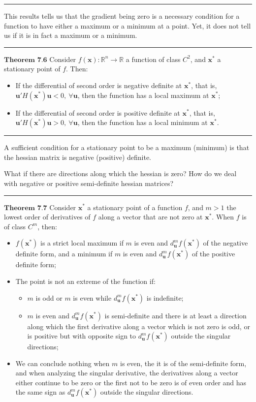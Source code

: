 \documentclass[0pt, a4paper]{article}
\begin{document}
\noindent\rule{\textwidth}{1pt}

This results tells us that the gradient being zero is a necessary condition for a function to have either a maximum or a minimum at a point. Yet, it does not tell us if it is in fact a maximum or a minimum.

\noindent\rule{\textwidth}{1pt}

$\textbf{Theorem 7.6}$ Consider $f(\textbf{x}):\mathbb{R}^n\to\mathbb{R}$ a function of class $C^2$, and $\textbf{x}^*$ a stationary point of $f$. Then:
\begin{itemize}
	\item If the differential of second order is negative  definite at $\textbf{x}^*$, that is, $\textbf{u}'H(\textbf{x}^*)\textbf{u}<0,\ \forall\textbf{u}$, then the function has a local maximum at $\textbf{x}^*$;
	\item If the differential of second order is positive definite at $\textbf{x}^*$, that is, $\textbf{u}'H(\textbf{x}^*)\textbf{u}>0,\ \forall\textbf{u}$, then the function has a local minimum at $\textbf{x}^*$.
\end{itemize}

\noindent\rule{\textwidth}{1pt}

A sufficient condition for a stationary point to be a maximum (minimum) is that the hessian matrix is negative (positive) definite. 

What if there are directions along which the hessian is zero? How do we deal with negative or positive semi-definite hessian matrices?

\noindent\rule{\textwidth}{1pt}

$\textbf{Theorem 7.7}$ Consider $\textbf{x}^*$ a stationary point of a function $f$, and $m>1$ the lowest order of derivatives of $f$ along a vector that are not zero at $\textbf{x}^*$. When $f$ is of class $C^m$, then:
\begin{itemize}
	\item $f(\textbf{x}^*)$ is a strict local maximum if $m$ is even and $d^m_\textbf{u}f(\textbf{x}^*)$ of the negative definite form, and a minimum if $m$ is even and $d^m_\textbf{u}f(\textbf{x}^*)$ of the positive definite form;
	\item The point is not an extreme of the function if:
	\begin{itemize}
		\item $m$ is odd or $m$ is even while $d^m_\textbf{u}f(\textbf{x}^*)$ is indefinite;
		\item $m$ is even and $d^m_\textbf{u}f(\textbf{x}^*)$ is semi-definite and there is at least a direction along which the first derivative along a vector which is not zero is odd, or is positive but with opposite sign to $d^m_\textbf{u}f(\textbf{x}^*)$ outside the singular directions;
	\end{itemize}
	\item We can conclude nothing when $m$ is even, the it is of the semi-definite form, and when analyzing the singular derivative, the derivatives along a vector either continue to be zero or the first not to be zero is of even order and has the same sign as $d^m_\textbf{u}f(\textbf{x}^*)$ outside the singular directions.
\end{itemize}
\end{document}
